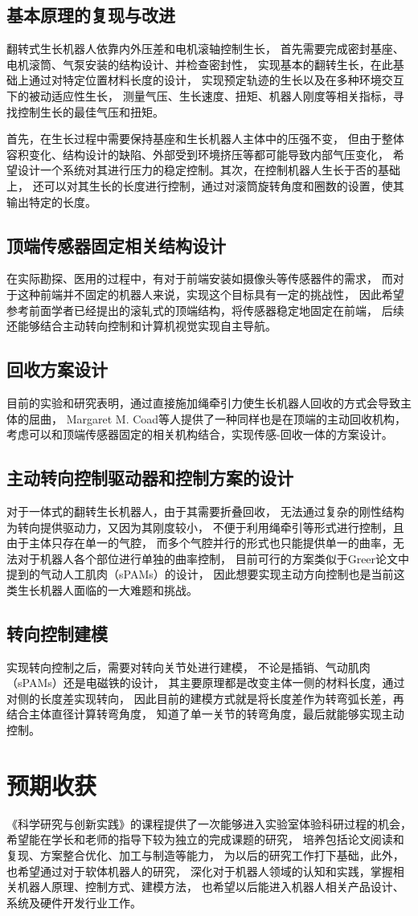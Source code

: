 \documentclass[11pt, a4paper, oneside]{ctexart}
\begin{document}
\subsection{基本原理的复现与改进}
翻转式生长机器人依靠内外压差和电机滚轴控制生长，
首先需要完成密封基座、电机滚筒、气泵安装的结构设计、并检查密封性，
实现基本的翻转生长，在此基础上通过对特定位置材料长度的设计，
实现预定轨迹的生长以及在多种环境交互下的被动适应性生长，
测量气压、生长速度、扭矩、机器人刚度等相关指标，寻找控制生长的最佳气压和扭矩。

首先，在生长过程中需要保持基座和生长机器人主体中的压强不变，
但由于整体容积变化、结构设计的缺陷、外部受到环境挤压等都可能导致内部气压变化，
希望设计一个系统对其进行压力的稳定控制。其次，在控制机器人生长于否的基础上，
还可以对其生长的长度进行控制，通过对滚筒旋转角度和圈数的设置，使其输出特定的长度。

\subsection{顶端传感器固定相关结构设计}
在实际勘探、医用的过程中，有对于前端安装如摄像头等传感器件的需求，
而对于这种前端并不固定的机器人来说，实现这个目标具有一定的挑战性，
因此希望参考前面学者已经提出的滚轧式的顶端结构，将传感器稳定地固定在前端，
后续还能够结合主动转向控制和计算机视觉实现自主导航。

\subsection{回收方案设计}
目前的实验和研究表明，通过直接施加绳牵引力使生长机器人回收的方式会导致主体的屈曲，
Margaret M. Coad等人提供了一种同样也是在顶端的主动回收机构，
考虑可以和顶端传感器固定的相关机构结合，实现传感-回收一体的方案设计。

\subsection{主动转向控制驱动器和控制方案的设计}
对于一体式的翻转生长机器人，由于其需要折叠回收，
无法通过复杂的刚性结构为转向提供驱动力，又因为其刚度较小，
不便于利用绳牵引等形式进行控制，且由于主体只存在单一的气腔，
而多个气腔并行的形式也只能提供单一的曲率，无法对于机器人各个部位进行单独的曲率控制，
目前可行的方案类似于Greer论文中提到的气动人工肌肉（sPAMs）的设计，
因此想要实现主动方向控制也是当前这类生长机器人面临的一大难题和挑战。

\subsection{转向控制建模}
实现转向控制之后，需要对转向关节处进行建模，
不论是插销、气动肌肉（sPAMs）还是电磁铁的设计，
其主要原理都是改变主体一侧的材料长度，通过对侧的长度差实现转向，
因此目前的建模方式就是将长度差作为转弯弧长差，再结合主体直径计算转弯角度，
知道了单一关节的转弯角度，最后就能够实现主动控制。

\section{预期收获}
《科学研究与创新实践》的课程提供了一次能够进入实验室体验科研过程的机会，
希望能在学长和老师的指导下较为独立的完成课题的研究，
培养包括论文阅读和复现、方案整合优化、加工与制造等能力，
为以后的研究工作打下基础，此外，也希望通过对于软体机器人的研究，
深化对于机器人领域的认知和实践，掌握相关机器人原理、控制方式、建模方法，
也希望以后能进入机器人相关产品设计、系统及硬件开发行业工作。

\newpage

\end{document}
